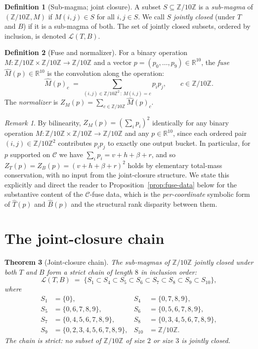 \documentclass[11pt,reqno]{amsart}
\theoremstyle{plain}
\newtheorem{theorem}{Theorem}
\theoremstyle{definition}
\newtheorem{definition}[theorem]{Definition}
\theoremstyle{remark}
\newtheorem*{remark}{Remark}
\newcommand{\Z}{\mathbb{Z}}
\newcommand{\R}{\mathbb{R}}
\newcommand{\Zten}{\Z/10\Z}
\newcommand{\Cfour}{\mathcal{C}}
\newcommand{\Tfuse}{\widehat{T}}
\newcommand{\Bfuse}{\widehat{B}}
\begin{document}
\begin{definition}[Sub-magma; joint closure]\label{def:submagma}
A subset $S\subseteq\Zten$ is a \emph{sub-magma} of $(\Zten,M)$ if
$M(i,j)\in S$ for all $i,j\in S$. We call $S$ \emph{jointly
closed} (under $T$ and $B$) if it is a sub-magma of both. The set
of jointly closed subsets, ordered by inclusion, is denoted
$\mathcal{L}(T,B)$.
\end{definition}

\begin{definition}[Fuse and normalizer]\label{def:fuse}
For a binary operation $M:\Zten\times\Zten\to\Zten$ and a vector
$p=(p_{0},\dots,p_{9})\in\R^{10}$, the \emph{fuse}
$\widehat{M}(p)\in\R^{10}$ is the convolution along the operation:
\[
\widehat{M}(p)_{c}\;=\;\sum_{(i,j)\in\Zten^{2}\,:\,M(i,j)=c}p_{i}p_{j},
\qquad c\in\Zten.
\]
The \emph{normalizer} is $Z_{M}(p)=\sum_{c\in\Zten}\widehat{M}(p)_{c}$.
\end{definition}

\begin{remark}\label{rem:total-mass}
By bilinearity, $Z_{M}(p) = (\sum_{i}p_{i})^{2}$ identically for
any binary operation $M:\Zten\times\Zten\to\Zten$ and any
$p\in\R^{10}$, since each ordered pair $(i,j)\in\Zten^{2}$
contributes $p_{i}p_{j}$ to exactly one output bucket. In
particular, for $p$ supported on $\Cfour$ we have
$\sum_{i}p_{i} = v+h+\beta+r$, and so
$Z_{T}(p) = Z_{B}(p) = (v+h+\beta+r)^{2}$ holds by elementary
total-mass conservation, with no input from the joint-closure
structure. We state this explicitly and direct the reader to
Proposition~\ref{prop:fuse-data} below for the substantive
content of the $\Cfour$-fuse data, which is the
\emph{per-coordinate} symbolic form of $\Tfuse(p)$ and
$\Bfuse(p)$ and the structural rank disparity between them.
\end{remark}

\section{The joint-closure chain}\label{sec:chain}

\begin{theorem}[Joint-closure chain]\label{thm:chain}
The sub-magmas of $\Zten$ jointly closed under both $T$ and $B$
form a strict chain of length $8$ in inclusion order:
\[
\mathcal{L}(T,B)\;=\;\bigl\{S_{1}\subset S_{4}\subset S_{5}\subset
S_{6}\subset S_{7}\subset S_{8}\subset S_{9}\subset S_{10}\bigr\},
\]
where
\begin{align*}
S_{1}&=\{0\}, & S_{4}&=\{0,7,8,9\}, \\
S_{5}&=\{0,6,7,8,9\}, & S_{6}&=\{0,5,6,7,8,9\}, \\
S_{7}&=\{0,4,5,6,7,8,9\}, & S_{8}&=\{0,3,4,5,6,7,8,9\}, \\
S_{9}&=\{0,2,3,4,5,6,7,8,9\}, & S_{10}&=\Zten.
\end{align*}
The chain is strict: no subset of $\Zten$ of size $2$ or size $3$
is jointly closed.
\end{theorem}
\end{document}
